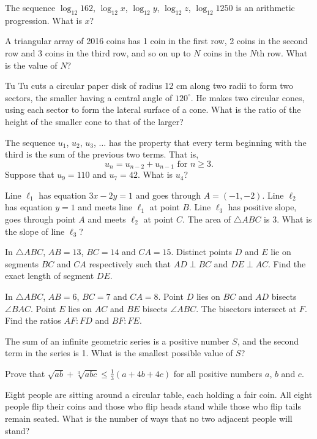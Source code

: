 \begin{problems}
    \problem The sequence $\log_{12}162$, $\log_{12}x$, $\log_{12}y$,
    $\log_{12}z$, $\log_{12}1250$ is an arithmetic progression. What is $x$?

    \problem A triangular array of 2016 coins has 1 coin in the first row, 2
    coins in the second row and 3 coins in the third row, and so on up to $N$
    coins in the $N$th row. What is the value of $N$?

    \problem Tu Tu cuts a circular paper disk of radius 12 cm along two radii
    to form two sectors, the smaller having a central angle of $120^\circ$. He
    makes two circular cones, using each sector to form the lateral surface of
    a cone. What is the ratio of the height of the smaller cone to that of the
    larger?

    \problem The sequence $u_{1}$, $u_{2}$, $u_{3}$, $\ldots$ has the property
    that every term beginning with the third is the sum of the previous two
    terms. That is, \[u_{n} = u_{n - 2} + u_{n - 1} \text{  for  } n \geq 3.\]
    Suppose that $u_{9} = 110$ and $u_{7} = 42$. What is $u_{4}$?

    \problem Line $\ell_{1}$ has equation $3x - 2y = 1$ and goes through $A =
    (-1, -2)$. Line $\ell_{2}$ has equation $y = 1$ and meets line $\ell_{1}$
    at point $B$. Line $\ell_{3}$ has positive slope, goes through point $A$
    and meets $\ell_{2}$ at point $C$. The area of $\triangle ABC$ is 3. What is
    the slope of line $\ell_{3}$?

    \problem In $\triangle ABC$, $AB = 13$, $BC = 14$ and $CA = 15$. Distinct
    points $D$ and $E$ lie on segments $BC$ and $CA$ respectively such that $AD
    \perp BC$ and $DE \perp AC$. Find the exact length of segment $DE$. 

    \problem In $\triangle ABC$, $AB = 6$, $BC = 7$ and $CA = 8$. Point $D$
    lies on $BC$ and $AD$ bisects $\angle BAC$. Point $E$ lies on $AC$ and $BE$
    bisects $\angle ABC$. The bisectors intersect at $F$. Find the ratios $AF :
    FD$ and $BF : FE$. 

    \problem The sum of an infinite geometric series is a positive number $S$,
    and the second term in the series is 1. What is the smallest possible value
    of $S$?

    \problem Prove that $\sqrt{ab} + \sqrt[3]{abc} \leq \frac{1}{3}(a + 4b +
    4c)$ for all positive numbers $a$, $b$ and $c$. 

    \problem Eight people are sitting around a circular table, each holding a
    fair coin. All eight people flip their coins and those who flip heads stand
    while those who flip tails remain seated. What is the number of ways that
    no two adjacent people will stand?


\end{problems}
